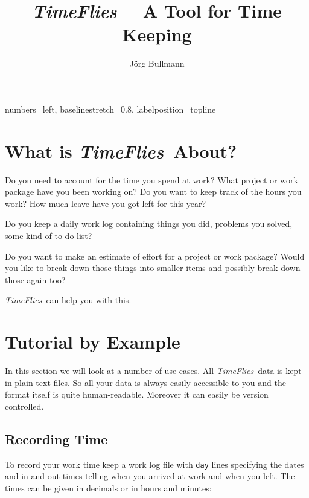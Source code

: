 \documentclass[11pt]{article}
\newcommand{\timeflies}{\emph{TimeFlies}}
\begin{document}
   {%
    numbers=left,
    baselinestretch=0.8,
    labelposition=topline}


\title{\timeflies\ -- A Tool for Time Keeping}
\author{J\"org Bullmann}
\maketitle
\tableofcontents
\newpage

\section{What is \timeflies\ About?}

Do you need to account for the time you spend at work? What project or work package have you been working on? Do you want to keep track of the hours you work? How much leave have you got left for this year?

Do you keep a daily work log containing things you did, problems you solved, some kind of to do list?

Do you want to make an estimate of effort for a project or work package? Would you like to break down those things into smaller items and possibly break down those again too?

\timeflies\ can help you with this.

\section{Tutorial by Example}

In this section we will look at a number of use cases. All \timeflies\ data is kept in plain text files. So all your data is always easily accessible to you and the format itself is quite human-readable. Moreover it can easily be version controlled.

\subsection{Recording Time}

To record your work time keep a work log file with \verb-day- lines specifying the dates and in and out times telling when you arrived at work and when you left. The times can be given in decimals or in hours and minutes:


\end{document}
